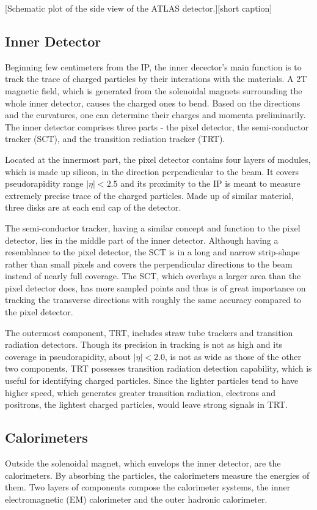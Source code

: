 \documentclass[class=NCU_thesis, crop=false]{standalone}
\begin{document}
	[Schematic plot of the side view of the ATLAS detector.][short caption]
	
	\subsection{Inner Detector}
		Beginning few centimeters from the IP, the inner decector's main function is to track the trace of charged particles by their interations with the materials. A 2T magnetic field, which is generated from the solenoidal magnets surrounding the whole inner detector, causes the charged ones to bend. Based on the directions and the curvatures, one can determine their charges and momenta preliminarily. The inner detector comprises three parts - the pixel detector, the semi-conductor tracker (SCT), and the transition rediation tracker (TRT).
		
		Located at the innermost part, the pixel detector contains four layers of modules, which is made up silicon, in the direction perpendicular to the beam. It covers pseudorapidity range $\lvert \eta \rvert < 2.5$ and its proximity to the IP is meant to measure extremely precise trace of the charged particles. Made up of similar material, three disks are at each end cap of the detector.
		
		The semi-conductor tracker, having a similar concept and function to the pixel detector, lies in the middle part of the inner detector. Although having a resemblance to the pixel detector, the SCT is in a long and narrow strip-shape rather than small pixels and covers the perpendicular directions to the beam instead of nearly full coverage. The SCT, which overlays a larger area than the pixel detector does, has more sampled points and thus is of great importance on tracking the transverse directions with roughly the same accuracy compared to the pixel detector.
		
		The outermost component, TRT, includes straw tube trackers and transition radiation detectors. Though its precision in tracking is not as high and its coverage in pseudorapidity, about $\rvert \eta \lvert < 2.0$, is not as wide as those of the other two components, TRT possesses transition radiation detection capability, which is useful for identifying charged particles. Since the lighter particles tend to have higher speed, which generates greater transition radiation, electrons and positrons, the lightest charged particles, would leave strong signals in TRT.
	
	\subsection{Calorimeters}
		Outside the solenoidal magnet, which envelops the inner detector, are the calorimeters. By absorbing the particles, the calorimeters measure the energies of them. Two layers of components compose the calorimeter systems, the inner electromagnetic (EM) calorimeter and the outer hadronic calorimeter.
		
\end{document}

